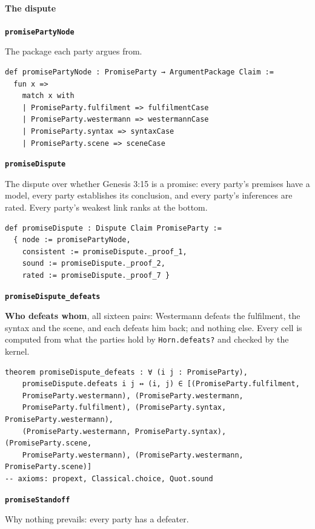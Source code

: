 \documentclass[11pt]{article}
\begin{document}
\paragraph*{The dispute}
\leavevmode\par\nobreak
\par\medskip\noindent\textbf{\texttt{promise\allowbreak{}Party\allowbreak{}Node}}\par\nobreak\noindent
The package each party argues from.

{\small\begin{verbatim}
def promisePartyNode : PromiseParty → ArgumentPackage Claim :=
  fun x =>
    match x with
    | PromiseParty.fulfilment => fulfilmentCase
    | PromiseParty.westermann => westermannCase
    | PromiseParty.syntax => syntaxCase
    | PromiseParty.scene => sceneCase
\end{verbatim}}
\par\medskip\noindent\textbf{\texttt{promise\allowbreak{}Dispute}}\par\nobreak\noindent
The dispute over whether Genesis 3:15 is a promise: every party’s premises have a model, every party establishes its conclusion, and every party’s inferences are rated. Every party’s weakest link ranks at the bottom.

{\small\begin{verbatim}
def promiseDispute : Dispute Claim PromiseParty :=
  { node := promisePartyNode,
    consistent := promiseDispute._proof_1,
    sound := promiseDispute._proof_2,
    rated := promiseDispute._proof_7 }
\end{verbatim}}
\par\medskip\noindent\textbf{\texttt{promise\allowbreak{}Dispute\_\allowbreak{}defeats}}\par\nobreak\noindent
\textbf{Who defeats whom}, all sixteen pairs: Westermann defeats the fulfilment, the syntax and the scene, and each defeats him back; and nothing else. Every cell is computed from what the parties hold by \texttt{Horn.defeats?} and checked by the kernel.

{\small\begin{verbatim}
theorem promiseDispute_defeats : ∀ (i j : PromiseParty),
    promiseDispute.defeats i j ↔ (i, j) ∈ [(PromiseParty.fulfilment,
    PromiseParty.westermann), (PromiseParty.westermann,
    PromiseParty.fulfilment), (PromiseParty.syntax, PromiseParty.westermann),
    (PromiseParty.westermann, PromiseParty.syntax), (PromiseParty.scene,
    PromiseParty.westermann), (PromiseParty.westermann, PromiseParty.scene)]
-- axioms: propext, Classical.choice, Quot.sound
\end{verbatim}}
\par\medskip\noindent\textbf{\texttt{promise\allowbreak{}Standoff}}\par\nobreak\noindent
Why nothing prevails: every party has a defeater.
\end{document}
